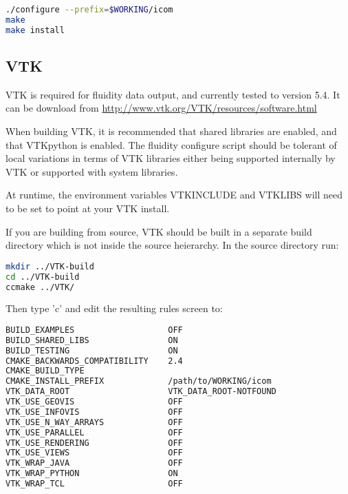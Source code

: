 \begin{lstlisting}[language=bash]
./configure --prefix=$WORKING/icom
make
make install
\end{lstlisting}

\subsection{VTK}
\label{sect:required_libraries_vtk}

VTK is required for fluidity data output, and currently tested to version 5.4.
It can be download from \url{http://www.vtk.org/VTK/resources/software.html}

When building VTK, it is recommended that shared libraries are enabled,
and that VTKpython is enabled.  The fluidity configure script should be tolerant of
local variations in terms of VTK libraries either being supported internally by
VTK or supported with system libraries.

At runtime, the environment variables VTK{\textunderscore}INCLUDE and
VTK{\textunderscore}LIBS will need to be set to point at your VTK install.

If you are building from source, VTK should be built in a separate build
directory which is not inside the source heierarchy. In the source directory
run:

\begin{lstlisting}[language=bash]
mkdir ../VTK-build
cd ../VTK-build
ccmake ../VTK/
\end{lstlisting}

Then type 'c' and edit the resulting rules screen to:

\begin{lstlisting}[language=bash]
BUILD_EXAMPLES                   OFF
BUILD_SHARED_LIBS                ON                                     
BUILD_TESTING                    ON
CMAKE_BACKWARDS_COMPATIBILITY    2.4
CMAKE_BUILD_TYPE
CMAKE_INSTALL_PREFIX             /path/to/WORKING/icom          
VTK_DATA_ROOT                    VTK_DATA_ROOT-NOTFOUND
VTK_USE_GEOVIS                   OFF                                    
VTK_USE_INFOVIS                  OFF                                    
VTK_USE_N_WAY_ARRAYS             OFF
VTK_USE_PARALLEL                 OFF
VTK_USE_RENDERING                OFF                                    
VTK_USE_VIEWS                    OFF                                    
VTK_WRAP_JAVA                    OFF
VTK_WRAP_PYTHON                  ON                                     
VTK_WRAP_TCL                     OFF
\end{lstlisting}

